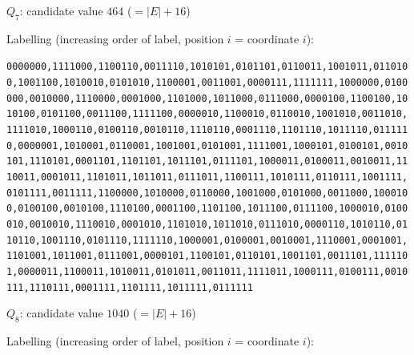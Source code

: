 
\(Q_7\): candidate value \(464\) (\(=|E|+16\))

Labelling (increasing order of label, position \(i\) = coordinate
\(i\)):

\texttt{0000000,1111000,1100110,0011110,1010101,0101101,0110011,1001011,0110100,1001100,1010010,0101010,1100001,0011001,0000111,1111111,1000000,0100000,0010000,1110000,0001000,1101000,1011000,0111000,0000100,1100100,1010100,0101100,0011100,1111100,0000010,1100010,0110010,1001010,0011010,1111010,1000110,0100110,0010110,1110110,0001110,1101110,1011110,0111110,0000001,1010001,0110001,1001001,0101001,1111001,1000101,0100101,0010101,1110101,0001101,1101101,1011101,0111101,1000011,0100011,0010011,1110011,0001011,1101011,1011011,0111011,1100111,1010111,0110111,1001111,0101111,0011111,1100000,1010000,0110000,1001000,0101000,0011000,1000100,0100100,0010100,1110100,0001100,1101100,1011100,0111100,1000010,0100010,0010010,1110010,0001010,1101010,1011010,0111010,0000110,1010110,0110110,1001110,0101110,1111110,1000001,0100001,0010001,1110001,0001001,1101001,1011001,0111001,0000101,1100101,0110101,1001101,0011101,1111101,0000011,1100011,1010011,0101011,0011011,1111011,1000111,0100111,0010111,1110111,0001111,1101111,1011111,0111111}

\(Q_8\): candidate value \(1040\) (\(=|E|+16\))

Labelling (increasing order of label, position \(i\) = coordinate
\(i\)):

